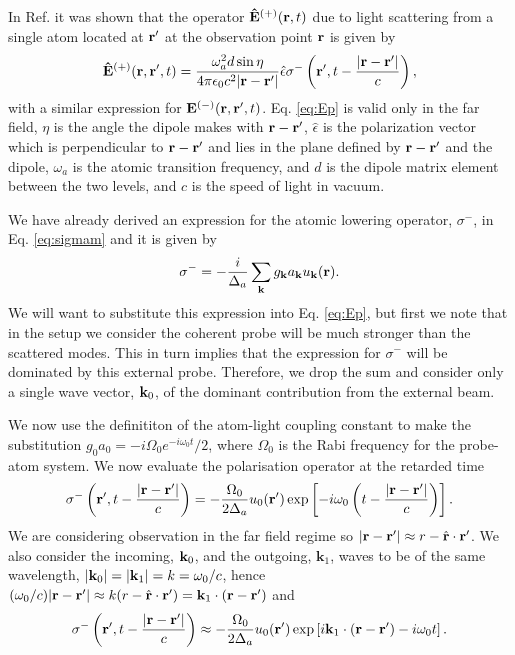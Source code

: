 In Ref. \cite{Scully} it was shown that the operator
$\mathbf{\hat{E}}^{(+)}(\mathbf{r},t)$ due to light scattering from a single
atom located at $\mathbf{r}^\prime$ at the observation point $\mathbf{r}$ is
given by
\begin{equation}
  \label{eq:Ep}
  \mathbf{\hat{E}}^{(+)}(\mathbf{r},\mathbf{r}^\prime,t) = \frac{\omega_a^2 d \sin \eta}{4 \pi
    \epsilon_0 c^2 |\mathbf{r} - \mathbf{r}^\prime|} \hat{\epsilon} \sigma^-
  \left( \mathbf{r}^\prime, t - \frac{|\mathbf{r} - \mathbf{r}^\prime|}{c} \right),
\end{equation}
with a similar expression for
$\mathbf{E}^{(-)}(\mathbf{r},\mathbf{r}^\prime,t)$. Eq. \eqref{eq:Ep} is valid only
in the far field, $\eta$ is the angle the dipole makes with
$\mathbf{r} - \mathbf{r}^\prime$, $\hat{\epsilon}$ is the polarization vector
which is perpendicular to $\mathbf{r} - \mathbf{r}^\prime$ and lies in the plane
defined by $\mathbf{r} - \mathbf{r}^\prime$ and the dipole, $\omega_a$ is the
atomic transition frequency, and $d$ is the dipole matrix element
between the two levels, and $c$ is the speed of light in vacuum.


We have already derived an expression for the atomic lowering
operator, $\sigma^-$, in Eq. \eqref{eq:sigmam} and it is given by
\begin{equation}
  \sigma^- = - \frac{i} {\Delta_a} \sum_{\mathbf{k}} g_{\mathbf{k}} a_{\mathbf{k}} u_{\mathbf{k}}(\mathbf{r}).
\end{equation}
We will want to substitute this expression into Eq. \eqref{eq:Ep}, but
first we note that in the setup we consider the coherent probe will be
much stronger than the scattered modes. This in turn implies that the
expression for $\sigma^-$ will be dominated by this external
probe. Therefore, we drop the sum and consider only a single wave
vector, $\mathbf{k}_0$, of the dominant contribution from the external
beam.

We now use the definititon of the atom-light coupling constant
\cite{Scully} to make the substitution
$g_0 a_0 = -i \Omega_0 e^{-i \omega_0 t} / 2$, where
$\Omega_0$ is the Rabi frequency for the probe-atom system. We now
evaluate the polarisation operator at the retarded time
\begin{equation}
  \sigma^- \left(\mathbf{r}^\prime, t - \frac{|\mathbf{r} - \mathbf{r}^\prime|}{c} \right) =
  -\frac{\Omega_0}{2 \Delta_a} u_0 (\mathbf{r}^\prime) \exp \left[-i \omega_0
    \left( t - \frac{|\mathbf{r} - \mathbf{r}^\prime|}{c} \right)\right].
\end{equation}
We are considering observation in the far field regime so
$|\mathbf{r} - \mathbf{r}^\prime| \approx r - \hat{\mathbf{r}} \cdot
\mathbf{r}^\prime$. We also consider the incoming, $\mathbf{k}_0$, and the
outgoing, $\mathbf{k}_1$, waves to be of the same wavelength,
$|\mathbf{k}_0| = |\mathbf{k}_1| = k = \omega_0 / c$, hence
$(\omega_0 / c) |\mathbf{r} - \mathbf{r}^\prime| \approx k (r - \hat{\mathbf{r}}
\cdot \mathbf{r}^\prime) = \mathbf{k}_1 \cdot (\mathbf{r} - \mathbf{r}^\prime )$ and
\begin{equation}
  \sigma^- \left(\mathbf{r}^\prime, t - \frac{|\mathbf{r} - \mathbf{r}^\prime|}{c} \right) \approx
  -\frac{\Omega_0}{2 \Delta_a} u_0 (\mathbf{r}^\prime) \exp \left[i
    \mathbf{k}_1 \cdot (\mathbf{r} - \mathbf{r}^\prime ) - i \omega_0 t \right].
\end{equation}

